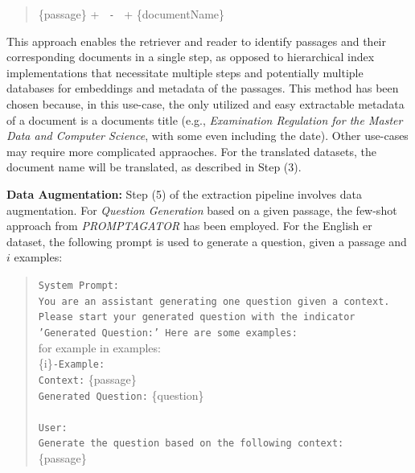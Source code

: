 \begin{quotation}
    \{passage\} + \texttt{ - } + \{documentName\}
\end{quotation}

This approach enables the retriever and reader to identify passages and their corresponding documents in a single step, as opposed to hierarchical index implementations that necessitate multiple steps and potentially multiple databases for embeddings and metadata of the passages. This method has been chosen because, in this use-case, the only utilized and easy extractable metadata of a document is a documents title (e.g., \textit{Examination Regulation for the Master Data and Computer Science}, with some even including the date). Other use-cases may require more complicated appraoches. For the translated datasets, the document name will be translated, as described in Step (3).

\textbf{Data Augmentation:} Step (5) of the extraction pipeline involves data augmentation. For \textit{Question Generation} based on a given passage, the few-shot approach from \textit{PROMPTAGATOR} \cite{dai_promptagator_2022} has been employed. For the English \gls{er} dataset, the following prompt is used to generate a question, given a passage and $i$ examples:

\begin{quote}
   \texttt{System Prompt:}\\
    \texttt{You are an assistant generating one question given a context. Please start your generated question with the indicator 'Generated Question:' Here are some examples:} \\
    for example in examples:\\
    \hspace*{1cm}\{i\}\texttt{-Example:} \\
    \hspace*{1cm}\texttt{Context:} \{passage\} \\
    \hspace*{1cm}\texttt{Generated Question:} \{question\} \\ \\
    \texttt{User:} \\
    \texttt{Generate the question based on the following context:}\\
    \{passage\}
    \label{prompt:system-prompt-data-generation}
\end{quote}

